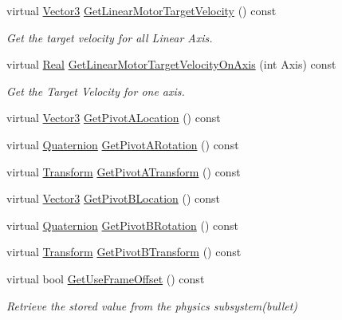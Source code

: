 \begin{DoxyCompactItemize}
virtual \hyperlink{classMezzanine_1_1Vector3}{Vector3} \hyperlink{classMezzanine_1_1Generic6DofConstraint_addd83b732df3f6fe730bf51b2153585e}{GetLinearMotorTargetVelocity} () const 
\begin{DoxyCompactList}\small\item\em Get the target velocity for all Linear Axis. \item\end{DoxyCompactList}\item 
virtual \hyperlink{namespaceMezzanine_a726731b1a7df72bf3583e4a97282c6f6}{Real} \hyperlink{classMezzanine_1_1Generic6DofConstraint_a3ad266a779d330634d524615c8a027dc}{GetLinearMotorTargetVelocityOnAxis} (int Axis) const 
\begin{DoxyCompactList}\small\item\em Get the Target Velocity for one axis. \item\end{DoxyCompactList}\item 
virtual \hyperlink{classMezzanine_1_1Vector3}{Vector3} \hyperlink{classMezzanine_1_1Generic6DofConstraint_a180f26186e0ddd58c9c0746897155eaf}{GetPivotALocation} () const 
\item 
virtual \hyperlink{classMezzanine_1_1Quaternion}{Quaternion} \hyperlink{classMezzanine_1_1Generic6DofConstraint_a517388fdf36423ed0550ec19089955b9}{GetPivotARotation} () const 
\item 
virtual \hyperlink{classMezzanine_1_1Transform}{Transform} \hyperlink{classMezzanine_1_1Generic6DofConstraint_adac17da02ce3ecacf583515a66576533}{GetPivotATransform} () const 
\item 
virtual \hyperlink{classMezzanine_1_1Vector3}{Vector3} \hyperlink{classMezzanine_1_1Generic6DofConstraint_a2b7344ab150f2f6dd898b6cbcd150d6e}{GetPivotBLocation} () const 
\item 
virtual \hyperlink{classMezzanine_1_1Quaternion}{Quaternion} \hyperlink{classMezzanine_1_1Generic6DofConstraint_ab3979edc1d5f3bfce878de009c18494d}{GetPivotBRotation} () const 
\item 
virtual \hyperlink{classMezzanine_1_1Transform}{Transform} \hyperlink{classMezzanine_1_1Generic6DofConstraint_ad38e140ea8edf8d9d74e99bbebf68417}{GetPivotBTransform} () const 
\item 
virtual bool \hyperlink{classMezzanine_1_1Generic6DofConstraint_ada22ae842e9212b0480bbfa866d16a08}{GetUseFrameOffset} () const 
\begin{DoxyCompactList}\small\item\em Retrieve the stored value from the physics subsystem(bullet) \item\end{DoxyCompactList}\item 

\end{DoxyCompactItemize}
